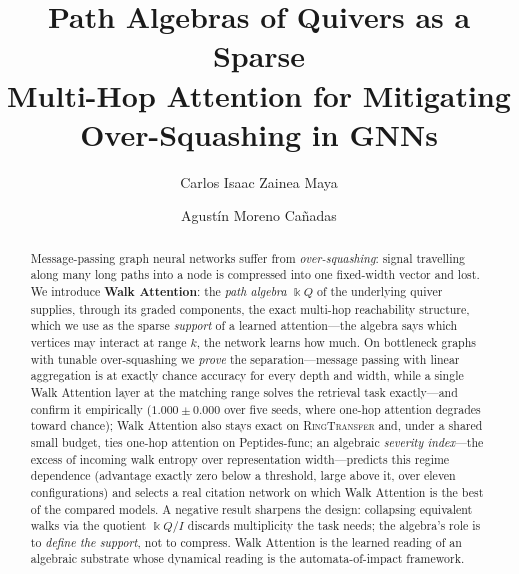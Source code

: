 \documentclass[runningheads]{llncs}
\newcommand{\kk}{\Bbbk}
\newcommand{\kQ}{\kk Q}
\begin{document}
\title{Path Algebras of Quivers as a Sparse\\ Multi-Hop Attention for Mitigating\\ Over-Squashing in GNNs}

\author{Carlos Isaac Zainea Maya \and
Agust\'in Moreno Ca\~nadas}

\maketitle

\begin{abstract}
Message-passing graph neural networks suffer from \emph{over-squashing}: signal
travelling along many long paths into a node is compressed into one fixed-width
vector and lost. We introduce \textbf{Walk Attention}: the \emph{path algebra}
$\kQ$ of the underlying quiver supplies, through its graded components, the
exact multi-hop reachability structure, which we use as the sparse
\emph{support} of a learned attention---the algebra says which vertices may
interact at range $k$, the network learns how much. On bottleneck graphs with
tunable over-squashing we \emph{prove} the separation---message passing with
linear aggregation is at exactly chance accuracy for every depth and width,
while a single Walk Attention layer at the matching range solves the retrieval
task exactly---and confirm it empirically ($1.000\pm0.000$ over five seeds,
where one-hop attention degrades toward chance); Walk Attention also stays
exact on \textsc{RingTransfer} and, under a shared small budget, ties one-hop
attention on Peptides-func; an algebraic \emph{severity index}---the excess of
incoming walk entropy over representation width---predicts this regime
dependence (advantage exactly zero below a threshold, large above it, over
eleven configurations) and selects a real citation network on which Walk
Attention is the best of the compared models. A negative result sharpens
the design: collapsing equivalent walks via the quotient $\kQ/I$ discards
multiplicity the task needs; the algebra's role is to \emph{define the support},
not to compress. Walk Attention is the learned reading of an algebraic
substrate whose dynamical reading is the automata-of-impact framework.

\end{abstract}
\end{document}
